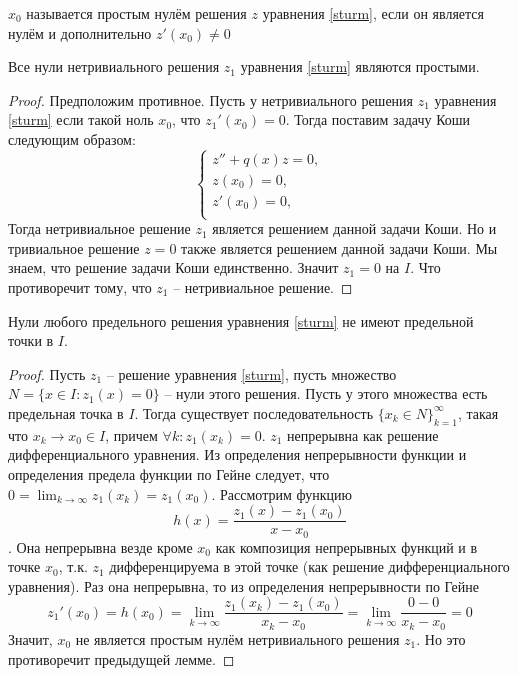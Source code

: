 \documentclass[document.tex]{subfiles}
\begin{document}
\begin{definition}
    $x_0$ называется простым нулём решения $z$ уравнения \ref{sturm}, если он является нулём и дополнительно $z'(x_0) \neq 0$
\end{definition}

\begin{lemma}
    \label{good_lemma}
    Все нули нетривиального решения $z_1$ уравнения \ref{sturm} являются простыми.
\end{lemma}

\begin{proof}
    Предположим противное. Пусть у нетривиального решения $z_1$ уравнения \ref{sturm} если такой ноль $x_0$, что $z_1'(x_0) = 0$. Тогда
    поставим задачу Коши следующим образом:
    \[
        \begin{cases}
            z'' + q(x)z = 0, \\
            z(x_0) = 0, \\
            z'(x_0) = 0, \\
        \end{cases}
    \]
    Тогда нетривиальное решение $z_1$ является решением данной задачи Коши. Но и тривиальное решение $z = 0$ также
    является решением данной задачи Коши. Мы знаем, что решение задачи Коши единственно. Значит $z_1 = 0$ на $I$. Что
    противоречит тому, что $z_1$ -- нетривиальное решение.
\end{proof}

\begin{lemma}
    Нули любого предельного решения уравнения \ref{sturm} не имеют предельной точки в $I$.
\end{lemma}

\begin{proof}
    Пусть $z_1$ -- решение уравнения \ref{sturm}, пусть множество $N = \{x \in I: z_1(x) = 0\}$ -- нули этого решения. Пусть у
    этого множества есть предельная точка в $I$. Тогда существует последовательность $\{x_k \in N\}_{k = 1}^{\infty}$,
    такая что $x_k \rightarrow x_0 \in I$, причем $\forall k: z_1(x_k) = 0$.
    $z_1$ непрерывна как решение дифференциального уравнения. Из определения непрерывности функции и определения предела
    функции по Гейне следует, что
    $0 = \lim_{k \rightarrow \infty} z_1(x_k) = z_1(x_0)$.
    Рассмотрим функцию
    \[
        h(x) = \frac{z_1(x) - z_1(x_0)}{x - x_0}
    \]. Она непрерывна везде кроме $x_0$ как композиция непрерывных функций и в точке $x_0$, т.к. $z_1$ дифференцируема
    в этой точке (как решение дифференциального уравнения). Раз она непрерывна, то из определения непрерывности по Гейне
    \[
        z_1'(x_0) = h(x_0) = \lim_{k \rightarrow \infty} \frac{z_1(x_k) - z_1(x_0)}{x_k - x_0} = \lim_{k \rightarrow
        \infty} \frac{0 - 0}{x_k - x_0} = 0
    \]
    Значит, $x_0$ не является простым нулём нетривиального решения $z_1$. Но это противоречит предыдущей лемме.
\end{proof}
\end{document}
